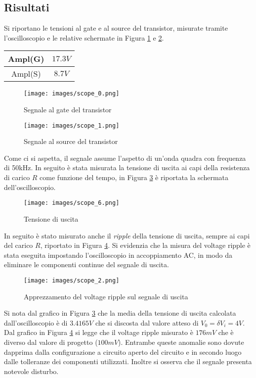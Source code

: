 \subsection{Risultati}
Si riportano le tensioni al gate e al source del transistor, misurate tramite l'oscilloscopio e le relative schermate in Figura \ref{fig:GateMeasure1} e \ref{fig:SourceMeasure1}.
\begin{table}[H]
    \centering
    \begin{tabular}{|c|c|}
        \hline
        Ampl(G)&$17.3V$\\\hline
        Ampl(S)&$8.7V$\\\hline
    \end{tabular}
\end{table}
\begin{figure}[H]
    \centering
    \texttt{[image: images/scope\_0.png]}
    \caption{Segnale al gate del transistor}
    \label{fig:GateMeasure1}
\end{figure}
\begin{figure}[H]
    \centering
    \texttt{[image: images/scope\_1.png]}
    \caption{Segnale al source del transistor}
    \label{fig:SourceMeasure1}
\end{figure}
Come ci si aspetta, il segnale assume l'aspetto di un'onda quadra con frequenza di 50kHz.
\clearpage
In seguito è stata misurata la tensione di uscita ai capi della resistenza di carico $R$ come funzione del tempo, in Figura \ref{fig:OutputLoad1} è riportata la schermata dell'oscilloscopio.
\begin{figure}[H]
    \centering
    \texttt{[image: images/scope\_6.png]}
    \caption{Tensione di uscita}
    \label{fig:OutputLoad1}
\end{figure}
In seguito è stato misurato anche il \textit{ripple} della tensione di uscita, sempre ai capi del carico $R$, riportato in Figura \ref{fig:OutputRipple1}. Si evidenzia che la misura del voltage ripple è stata eseguita impostando l'oscilloscopio in accoppiamento AC, in modo da eliminare le componenti continue del segnale di uscita.
\begin{figure}[H]
    \centering
    \texttt{[image: images/scope\_2.png]}
    \caption{Apprezzamento del voltage ripple sul segnale di uscita}
    \label{fig:OutputRipple1}
\end{figure}
Si nota dal grafico in Figura \ref{fig:OutputLoad1} che la media della tensione di uscita calcolata dall'oscilloscopio è di $3.4165V$ che si discosta dal valore atteso di $V_0=\delta V_i=4V$. Dal grafico in Figura \ref{fig:OutputRipple1} si legge che il voltage ripple misurato è $176mV$ che è diverso dal valore di progetto ($100mV$). Entrambe queste anomalie sono dovute dapprima dalla configurazione a circuito aperto del circuito e in secondo luogo dalle tolleranze dei componenti utilizzati. Inoltre si osserva che il segnale presenta notevole disturbo.
\clearpage



